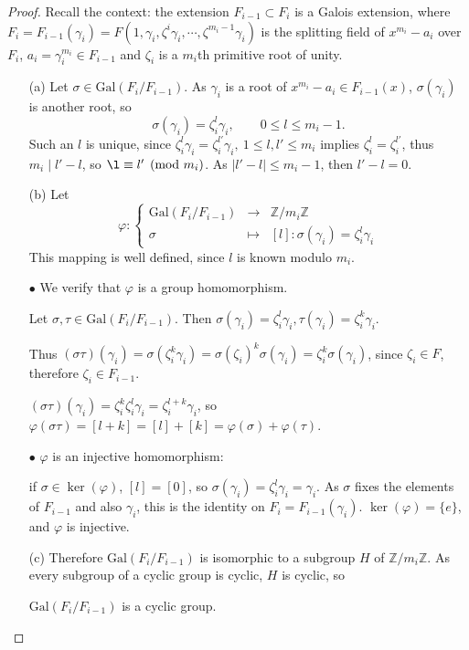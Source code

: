 \documentclass[11pt,a4paper]{article}
\newcommand{\Z}{\mathbb{Z}}
\newcommand{\Gal}{\mathrm{Gal}}
\begin{document}
\begin{proof}
Recall the context: the extension $F_{i-1} \subset F_i$ is a Galois extension, 
where $F_i = F_{i-1}(\gamma_i)  = F(1,\gamma_i,\zeta^i \gamma_i,\cdots,\zeta^{m_i-1} \gamma_i)$ is the splitting field of $x^{m_i} - a_i$ over $F_i$,
 $a_i = \gamma_i^{m_i} \in F_{i-1}$ and $\zeta_i$ is a $m_i$th primitive root of unity.

\begin{enumerate}
\item[(a)]
Let $\sigma \in \Gal(F_i/F_{i-1})$. As $\gamma_i$ is a root of $x^{m_i}-a_i \in F_{i-1}(x)$, $\sigma(\gamma_i)$ is another root, so
$$\sigma(\gamma_i) = \zeta_i^l \gamma_i,\qquad 0 \leq l \leq m_i-1.$$
Such an $l$ is unique, since $ \zeta_i^l \gamma_i =  \zeta_i^{l'}\gamma_i, \ 1\leq l,l' \leq m_i$ implies $\zeta_i^l = \zeta_i^{l'}$, thus $m_i \mid l'-l$, so $\l \equiv l' \pmod{ m_i}$. As $\vert l' -l \vert \leq m_i-1$, then $l'-l=0$.


\item[(b)]
Let
$$
\varphi :
\left\{
\begin{array}{ccc}
  \Gal(F_i/F_{i-1})&\to   &\Z/m_i\Z   \\
 \sigma &  \mapsto &   [l] : \sigma(\gamma_i) = \zeta_i^l \gamma_i
\end{array}
\right.
$$
This mapping is well defined, since $l$ is known modulo $m_i$.

$\bullet$ We verify that $\varphi$ is a group homomorphism.

Let $\sigma,\tau \in \Gal(F_i/F_{i-1})$. Then $\sigma(\gamma_i) = \zeta_i^l \gamma_i, \tau(\gamma_i) = \zeta_i^k \gamma_i$.

Thus $(\sigma \tau)(\gamma_i) = \sigma(\zeta_i^k \gamma_i) = \sigma(\zeta_i)^k \sigma(\gamma_i) = \zeta_i^k \sigma(\gamma_i)$, since $\zeta_i \in F$, therefore $\zeta_i \in F_{i-1}$.
 
  $(\sigma \tau)(\gamma_i) =  \zeta_i^k   \zeta_i^l \gamma_i = \zeta_i^{l+k} \gamma_i$, so $\varphi(\sigma \tau) = [l+k] = [l]+[k] = \varphi(\sigma) + \varphi(\tau)$.
  
  $\bullet$ $\varphi$ is an injective homomorphism: 
  
if $\sigma \in \ker(\varphi)$, $[l] = [0]$, so $\sigma(\gamma_i) = \zeta_i^l \gamma_i = \gamma_i$. As $\sigma$ fixes the elements of $F_{i-1}$ and also $\gamma_{i}$, this is the identity on $F_i=F_{i-1}(\gamma_i)$. $\ker(\varphi) = \{e\}$, and $\varphi$ is injective.
  
\item[(c)]
Therefore $\Gal(F_i/F_{i-1})$ is isomorphic to a subgroup $H$ of $\Z/m_i\Z$. As every subgroup of a cyclic group is cyclic, $H$ is cyclic, so 
\begin{center}
$\Gal(F_i/F_{i-1})$ is a cyclic group.
\end{center}
\end{enumerate}
\end{proof}
\end{document}
